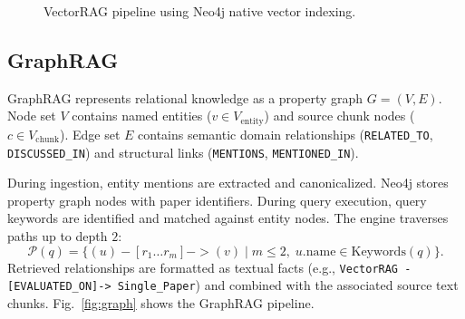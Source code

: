 \documentclass[conference]{IEEEtran}
\begin{document}
\begin{figure}[t]
\centering
{}
\caption{VectorRAG pipeline using Neo4j native vector indexing.}
\label{fig:vector}
\end{figure}

\subsection{GraphRAG}
\label{sec:graph}
GraphRAG represents relational knowledge as a property graph $G=(V, E)$. Node set $V$ contains named entities ($v \in V_{\text{entity}}$) and source chunk nodes ($c \in V_{\text{chunk}}$). Edge set $E$ contains semantic domain relationships (\texttt{RELATED\_TO}, \texttt{DISCUSSED\_IN}) and structural links (\texttt{MENTIONS}, \texttt{MENTIONED\_IN}).

During ingestion, entity mentions are extracted and canonicalized. Neo4j stores property graph nodes with paper identifiers. During query execution, query keywords are identified and matched against entity nodes. The engine traverses paths up to depth $2$:
\begin{equation}
\mathcal{P}(q) = \{ (u) -[r_1 \dots r_m]-> (v) \mid m \le 2,\; u.\text{name} \in \text{Keywords}(q) \}.
\end{equation}
Retrieved relationships are formatted as textual facts (e.g., \texttt{VectorRAG -[EVALUATED\_ON]-> Single\_Paper}) and combined with the associated source text chunks. Fig.~\ref{fig:graph} shows the GraphRAG pipeline.
\end{document}
